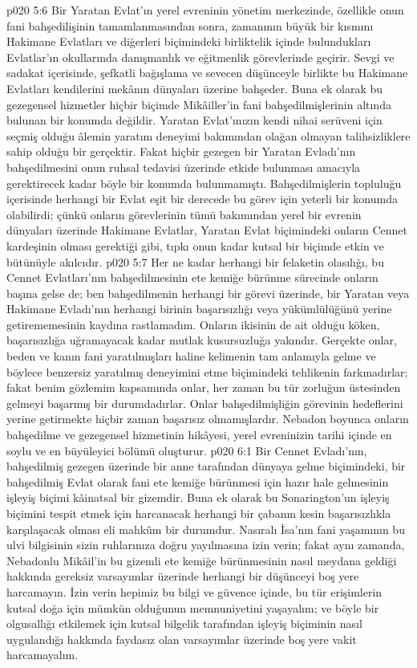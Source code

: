 \vs p020 5:6 Bir Yaratan Evlat’ın yerel evreninin yönetim merkezinde, özellikle onun fani bahşedilişinin tamamlanmasından sonra, zamanının büyük bir kısmını Hakimane Evlatları ve diğerleri biçimindeki birliktelik içinde bulundukları Evlatlar’ın okullarında danışmanlık ve eğitmenlik görevlerinde geçirir. Sevgi ve sadakat içerisinde, şefkatli bağışlama ve sevecen düşünceyle birlikte bu Hakimane Evlatları kendilerini mekânın dünyaları üzerine bahşeder. Buna ek olarak bu gezegensel hizmetler hiçbir biçimde Mikâiller’in fani bahşedilmişlerinin altında bulunan bir konumda değildir. Yaratan Evlat’ınızın kendi nihai serüveni için seçmiş olduğu âlemin yaratım deneyimi bakımından olağan olmayan talihsizliklere sahip olduğu bir gerçektir. Fakat hiçbir gezegen bir Yaratan Evladı’nın bahşedilmesini onun ruhsal tedavisi üzerinde etkide bulunması amacıyla gerektirecek kadar böyle bir konumda bulunmamıştı. Bahşedilmişlerin topluluğu içerisinde herhangi bir Evlat eşit bir derecede bu görev için yeterli bir konumda olabilirdi; çünkü onların görevlerinin tümü bakımından yerel bir evrenin dünyaları üzerinde Hakimane Evlatlar, Yaratan Evlat biçimindeki onların Cennet kardeşinin olması gerektiği gibi, tıpkı onun kadar kutsal bir biçimde etkin ve bütünüyle akılcıdır.
\vs p020 5:7 Her ne kadar herhangi bir felaketin olasılığı, bu Cennet Evlatları’nın bahşedilmesinin ete kemiğe bürünme sürecinde onların başına gelse de; ben bahşedilmenin herhangi bir görevi üzerinde, bir Yaratan veya Hakimane Evladı’nın herhangi birinin başarısızlığı veya yükümlülüğünü yerine getirememesinin kaydına rastlamadım. Onların ikisinin de ait olduğu köken, başarısızlığa uğramayacak kadar mutlak kusursuzluğa yakındır. Gerçekte onlar, beden ve kanın fani yaratılmışları haline kelimenin tam anlamıyla gelme ve böylece benzersiz yaratılmış deneyimini etme biçimindeki tehlikenin farkınadırlar; fakat benim gözlemim kapsamında onlar, her zaman bu tür zorluğun üstesinden gelmeyi başarmış bir durumdadırlar. Onlar bahşedilmişliğin görevinin hedeflerini yerine getirmekte hiçbir zaman başarısız olmamışlardır. Nebadon boyunca onların bahşedilme ve gezegensel hizmetinin hikâyesi, yerel evreninizin tarihi içinde en soylu ve en büyüleyici bölümü oluşturur.
\vs p020 6:1 Bir Cennet Evladı’nın, bahşedilmiş gezegen üzerinde bir anne tarafından dünyaya gelme biçimindeki, bir bahşedilmiş Evlat olarak fani ete kemiğe bürünmesi için hazır hale gelmesinin işleyiş biçimi kâinatsal bir gizemdir. Buna ek olarak bu Sonarington’un işleyiş biçimini tespit etmek için harcanacak herhangi bir çabanın kesin başarısızlıkla karşılaşacak olması eli mahkûm bir durumdur. Nasıralı İsa’nın fani yaşamının bu ulvi bilgisinin sizin ruhlarınıza doğru yayılmasına izin verin; fakat aynı zamanda, Nebadonlu Mikâil’in bu gizemli ete kemiğe bürünmesinin nasıl meydana geldiği hakkında gereksiz varsayımlar üzerinde herhangi bir düşünceyi boş yere harcamayın. İzin verin hepimiz bu bilgi ve güvence içinde, bu tür erişimlerin kutsal doğa için mümkün olduğunun memnuniyetini yaşayalım; ve böyle bir olgusallığı etkilemek için kutsal bilgelik tarafından işleyiş biçiminin nasıl uygulandığı hakkında faydasız olan varsayımlar üzerinde boş yere vakit harcamayalım.
